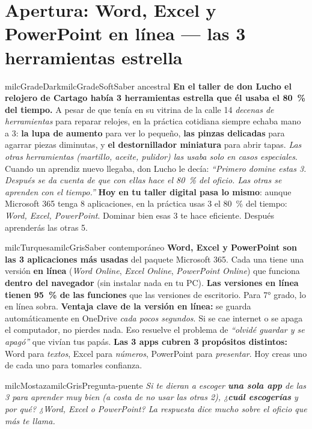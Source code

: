 \documentclass[11pt,letterpaper]{article}
\begin{document}
\section*{Apertura: Word, Excel y PowerPoint en línea --- las 3 herramientas estrella}

\begin{softbox}{milcGradeDark}{milcGradeSoft}{Saber ancestral}
\textbf{En el taller de don Lucho el relojero de Cartago había 3 herramientas estrella que él usaba el 80~\% del tiempo.} A pesar de que tenía en su vitrina de la calle 14 \emph{decenas de herramientas} para reparar relojes, en la práctica cotidiana siempre echaba mano a 3: \textbf{la lupa de aumento} para ver lo pequeño, \textbf{las pinzas delicadas} para agarrar piezas diminutas, y \textbf{el destornillador miniatura} para abrir tapas. \emph{Las otras herramientas (martillo, aceite, pulidor) las usaba solo en casos especiales}. Cuando un aprendiz nuevo llegaba, don Lucho le decía: \emph{``Primero domine estas 3. Después se da cuenta de que con ellas hace el 80~\% del oficio. Las otras se aprenden con el tiempo.''} \textbf{Hoy en tu taller digital pasa lo mismo}: aunque Microsoft 365 tenga 8 aplicaciones, en la práctica usas 3 el 80~\% del tiempo: \emph{Word, Excel, PowerPoint}. Dominar bien esas 3 te hace eficiente. Después aprenderás las otras 5.
\end{softbox}

\begin{softbox}{milcTurquesa}{milcGris}{Saber contemporáneo}
\textbf{Word, Excel y PowerPoint son las 3 aplicaciones más usadas} del paquete Microsoft 365. Cada una tiene una versión \textbf{en línea} (\emph{Word Online}, \emph{Excel Online}, \emph{PowerPoint Online}) que funciona \textbf{dentro del navegador} (sin instalar nada en tu PC). \textbf{Las versiones en línea tienen 95~\% de las funciones} que las versiones de escritorio. Para 7° grado, lo en línea sobra. \textbf{Ventaja clave de la versión en línea:} se guarda automáticamente en OneDrive \emph{cada pocos segundos}. Si se cae internet o se apaga el computador, no pierdes nada. Eso resuelve el problema de \emph{``olvidé guardar y se apagó''} que vivían tus papás. \textbf{Las 3 apps cubren 3 propósitos distintos:} Word para \emph{textos}, Excel para \emph{números}, PowerPoint para \emph{presentar}. Hoy creas uno de cada uno para tomarles confianza.
\end{softbox}

\begin{softbox}{milcMostaza}{milcGris}{Pregunta-puente}
\textit{Si te dieran a escoger \textbf{una sola app} de las 3 para aprender muy bien (a costa de no usar las otras 2), ¿\textbf{cuál escogerías} y por qué? ¿Word, Excel o PowerPoint? La respuesta dice mucho sobre el oficio que más te llama.}
\end{softbox}
\end{document}
